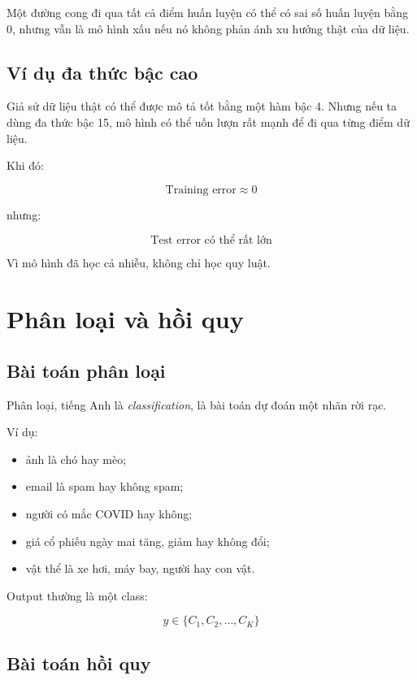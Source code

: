 \documentclass[12pt,a4paper]{report}
\begin{document}
\begin{canhbao}
Một đường cong đi qua tất cả điểm huấn luyện có thể có sai số huấn luyện bằng 0, nhưng vẫn là mô hình xấu nếu nó không phản ánh xu hướng thật của dữ liệu.
\end{canhbao}

\section{Ví dụ đa thức bậc cao}

Giả sử dữ liệu thật có thể được mô tả tốt bằng một hàm bậc 4. Nhưng nếu ta dùng đa thức bậc 15, mô hình có thể uốn lượn rất mạnh để đi qua từng điểm dữ liệu.

Khi đó:

\[
    \text{Training error} \approx 0
\]

nhưng:

\[
    \text{Test error} \text{ có thể rất lớn}
\]

Vì mô hình đã học cả nhiễu, không chỉ học quy luật.

\chapter{Phân loại và hồi quy}

\section{Bài toán phân loại}

Phân loại, tiếng Anh là \textit{classification}, là bài toán dự đoán một nhãn rời rạc.

Ví dụ:

\begin{itemize}
    \item ảnh là chó hay mèo;
    \item email là spam hay không spam;
    \item người có mắc COVID hay không;
    \item giá cổ phiếu ngày mai tăng, giảm hay không đổi;
    \item vật thể là xe hơi, máy bay, người hay con vật.
\end{itemize}

Output thường là một class:

\[
    y \in \{C_1,C_2,\ldots,C_K\}
\]

\section{Bài toán hồi quy}
\end{document}
